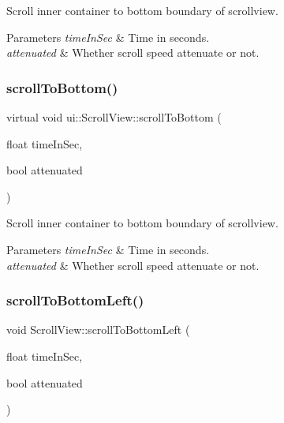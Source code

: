 Scroll inner container to bottom boundary of scrollview. 
\begin{DoxyParams}{Parameters}
{\em time\+In\+Sec} & Time in seconds. \\
\hline
{\em attenuated} & Whether scroll speed attenuate or not. \\
\hline
\end{DoxyParams}
\mbox{\label{classui_1_1ScrollView_a8a3f86d2afb79dc39580cf3efd87de19}} 
\subsubsection{\texorpdfstring{scroll\+To\+Bottom()}{scrollToBottom()}\hspace{0.1cm}{\footnotesize\ttfamily [2/2]}}
{\footnotesize\ttfamily virtual void ui\+::\+Scroll\+View\+::scroll\+To\+Bottom (\begin{DoxyParamCaption}\item[{float}]{time\+In\+Sec,  }\item[{bool}]{attenuated }\end{DoxyParamCaption})\hspace{0.3cm}{\ttfamily [virtual]}}

Scroll inner container to bottom boundary of scrollview. 
\begin{DoxyParams}{Parameters}
{\em time\+In\+Sec} & Time in seconds. \\
\hline
{\em attenuated} & Whether scroll speed attenuate or not. \\
\hline
\end{DoxyParams}
\mbox{\label{classui_1_1ScrollView_a790fc2a5c704a876745fcf262605cb49}} 
\subsubsection{\texorpdfstring{scroll\+To\+Bottom\+Left()}{scrollToBottomLeft()}\hspace{0.1cm}{\footnotesize\ttfamily [1/2]}}
{\footnotesize\ttfamily void Scroll\+View\+::scroll\+To\+Bottom\+Left (\begin{DoxyParamCaption}\item[{float}]{time\+In\+Sec,  }\item[{bool}]{attenuated }\end{DoxyParamCaption})\hspace{0.3cm}{\ttfamily [virtual]}}


